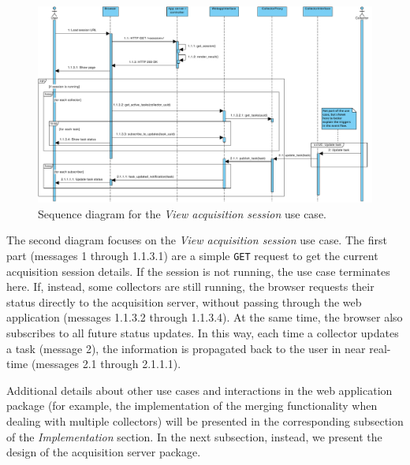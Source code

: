 \begin{figure}
  \centering
  \includegraphics[height=0.95\linewidth,angle=90,origin=c]{images/seq-view-session}
  \caption{Sequence diagram for the \emph{View acquisition session} use case.}
  \label{fig:seq-view-session}
\end{figure}

The second diagram focuses on the \emph{View acquisition session} use case. The first part (messages 1 through 1.1.3.1) are a simple \texttt{GET} request to get the current acquisition session details. If the session is not running, the use case terminates here. If, instead, some collectors are still running, the browser requests their status directly to the acquisition server, without passing through the web application (messages 1.1.3.2 through 1.1.3.4). At the same time, the browser also subscribes to all future status updates. In this way, each time a collector updates a task (message 2), the information is propagated back to the user in near real-time (messages 2.1 through 2.1.1.1).

Additional details about other use cases and interactions in the web application package (for example, the implementation of the merging functionality when dealing with multiple collectors) will be presented in the corresponding subsection of the \emph{Implementation} section. In the next subsection, instead, we present the design of the acquisition server package.


